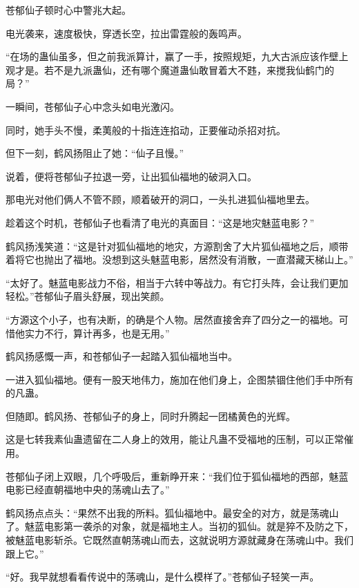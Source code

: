 
\begin{this_body}

苍郁仙子顿时心中警兆大起。

电光袭来，速度极快，穿透长空，拉出雷霆般的轰鸣声。

“在场的蛊仙虽多，但之前我派算计，赢了一手，按照规矩，九大古派应该作壁上观才是。若不是九派蛊仙，还有哪个魔道蛊仙敢冒着大不韪，来搅我仙鹤门的局？”

一瞬间，苍郁仙子心中念头如电光激闪。

同时，她手头不慢，柔荑般的十指连连掐动，正要催动杀招对抗。

但下一刻，鹤风扬阻止了她：“仙子且慢。”

说着，便将苍郁仙子拉退一旁，让出狐仙福地的破洞入口。

那电光对他们俩人不管不顾，顺着破开的洞口，一头扎进狐仙福地里去。

趁着这个时机，苍郁仙子也看清了电光的真面目：“这是地灾魅蓝电影？”

鹤风扬浅笑道：“这是针对狐仙福地的地灾，方源割舍了大片狐仙福地之后，顺带着将它也抛出了福地。没想到这头魅蓝电影，居然没有消散，一直潜藏天梯山上。”

“太好了。魅蓝电影战力不俗，相当于六转中等战力。有它打头阵，会让我们更加轻松。”苍郁仙子眉头舒展，现出笑颜。

“方源这个小子，也有决断，的确是个人物。居然直接舍弃了四分之一的福地。可惜他实力不行，算计再多，也是无用。”

鹤风扬感慨一声，和苍郁仙子一起踏入狐仙福地当中。

一进入狐仙福地。便有一股天地伟力，施加在他们身上，企图禁锢住他们手中所有的凡蛊。

但随即。鹤风扬、苍郁仙子的身上，同时升腾起一团橘黄色的光辉。

这是七转我素仙蛊遗留在二人身上的效用，能让凡蛊不受福地的压制，可以正常催用。

苍郁仙子闭上双眼，几个呼吸后，重新睁开来：“我们位于狐仙福地的西部，魅蓝电影已经直朝福地中央的荡魂山去了。”

鹤风扬点点头：“果然不出我的所料。狐仙福地中。最安全的对方，就是荡魂山了。魅蓝电影第一袭杀的对象，就是福地主人。当初的狐仙。就是猝不及防之下，被魅蓝电影斩杀。它既然直朝荡魂山而去，这就说明方源就藏身在荡魂山中。我们跟上它。”

“好。我早就想看看传说中的荡魂山，是什么模样了。”苍郁仙子轻笑一声。


\end{this_body}
